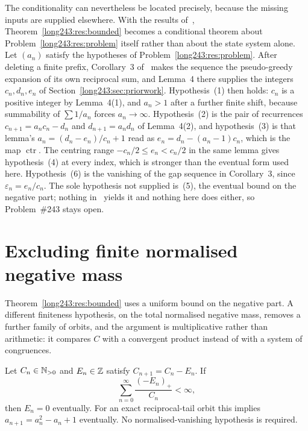 \documentclass[11pt]{article}
\newcommand{\ctr}{\operatorname{ctr}}
\begin{document}
The conditionality can nevertheless be located precisely, because the missing
inputs are supplied elsewhere.  With the results of~\cite{koizumi2025},
Theorem~\ref{long243:res:bounded} becomes a conditional theorem about
Problem~\ref{long243:res:problem} itself rather than about the state system alone.  Let
$(a_n)$ satisfy the hypotheses of Problem~\ref{long243:res:problem}.  After deleting a
finite prefix, Corollary~3 of~\cite[p.~9]{koizumi2025} makes the sequence the
pseudo-greedy expansion of its own reciprocal sum, and Lemma~4 there supplies
the integers $c_n,d_n,e_n$ of Section~\ref{long243:sec:priorwork}.  Hypothesis~(1) then
holds: $c_n$ is a positive integer by Lemma~4(1), and $a_n>1$ after a further
finite shift, because summability of $\sum1/a_n$ forces $a_n\to\infty$.
Hypothesis~(2) is the pair of recurrences $c_{n+1}=a_nc_n-d_n$ and
$d_{n+1}=a_nd_n$ of Lemma~4(2), and hypothesis~(3) is that lemma's
$a_n=(d_n-e_n)/c_n+1$ read as $e_n=d_n-(a_n-1)c_n$, which is the map $\ctr$.
The centring range $-c_n/2\le e_n<c_n/2$ in the same lemma gives
hypothesis~(4) at every index, which is stronger than the eventual form used
here.  Hypothesis~(6) is the vanishing
of the gap sequence in Corollary~3, since $\varepsilon_n=e_n/c_n$.  The sole
hypothesis not supplied is~(5), the eventual bound on the negative part;
nothing in~\cite{koizumi2025} yields it and nothing here does either, so
Problem~\#243 stays open.

\section{Excluding finite normalised negative mass}\label{long243:sec:mass}

Theorem~\ref{long243:res:bounded} uses a uniform bound on the negative part.  A
different finiteness hypothesis, on the total normalised negative mass, removes
a further family of orbits, and the argument is multiplicative rather than
arithmetic: it compares $C$ with a convergent product instead of with a system
of congruences.

\begin{theorem}\label{long243:res:mass}
Let \(C_n\in\mathbb{N}_{>0}\) and \(E_n\in\mathbb{Z}\) satisfy \(C_{n+1}=C_n-E_n\).
If
\[
 \sum_{n=0}^{\infty}\frac{(-E_n)_+}{C_n}<\infty,
\]
then \(E_n=0\) eventually. For an exact reciprocal-tail orbit this implies
\(a_{n+1}=a_n^2-a_n+1\) eventually. No normalised-vanishing hypothesis is required.
\end{theorem}
\end{document}
